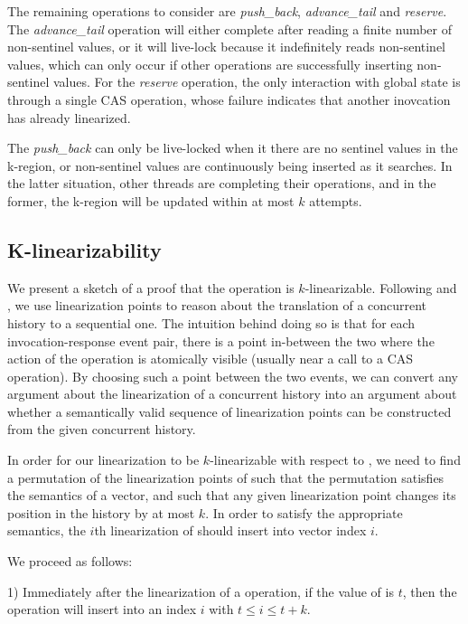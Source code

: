 \documentclass{sigplanconf}
\begin{document}
The remaining operations to consider are \emph{push\_back}, \emph{advance\_tail} and \emph{reserve}.
The \emph{advance\_tail} operation will either complete after reading a finite number of non-sentinel values, or it will live-lock because it indefinitely reads non-sentinel values, which can only occur if other operations are successfully inserting non-sentinel values. For the \emph{reserve} operation, the only interaction with global state is through a single CAS operation, whose failure indicates that another inovcation has already linearized.

The \emph{push\_back} can only be live-locked when it there are no sentinel values in the k-region, or non-sentinel values are continuously being inserted as it searches. In the latter situation, other threads are completing their operations, and in the former, the k-region will be updated within at most $k$ attempts.

\subsection{K-linearizability}

We present a sketch of a proof that the  operation is $k$-linearizable. Following \citet{dechev06} and \citet{opodis10}, we use linearization points to reason about the translation of a concurrent history to a sequential one. The intuition behind doing so is that for each invocation-response event pair, there is a point in-between the two where the action of the operation is atomically visible (usually near a call to a CAS operation). By choosing such a point between the two events, we can convert any argument about the linearization of a concurrent history into an argument about whether a semantically valid sequence of linearization points can be constructed from the given concurrent history.

In order for our linearization to be $k$-linearizable with respect to , we need to find a permutation of the linearization points of  such that the permutation satisfies the semantics of a vector, and such that any given linearization point changes its position in the history by at most $k$. In order to satisfy the appropriate semantics, the $i$th linearization of  should insert into vector index $i$.

We proceed as follows:

1) Immediately after the linearization of a  operation, if the value of  is $t$, then the operation will insert into an index $i$ with $t \le i \le t + k$. 
\end{document}
